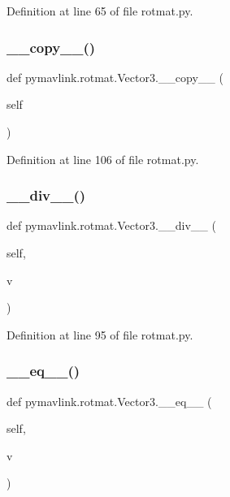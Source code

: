 Definition at line 65 of file rotmat.\+py.

\mbox{\label{classpymavlink_1_1rotmat_1_1Vector3_acf9ffe33395785fa44d643dafeddca03}} 
\subsubsection{\texorpdfstring{\_\_copy\_\_()}{\_\_copy\_\_()}}
{\footnotesize\ttfamily def pymavlink.\+rotmat.\+Vector3.\+\_\+\+\_\+copy\+\_\+\+\_\+ (\begin{DoxyParamCaption}\item[{}]{self }\end{DoxyParamCaption})}



Definition at line 106 of file rotmat.\+py.

\mbox{\label{classpymavlink_1_1rotmat_1_1Vector3_aa2b5ddcbf7fea7dd749f2b8d38df9e25}} 
\subsubsection{\texorpdfstring{\_\_div\_\_()}{\_\_div\_\_()}}
{\footnotesize\ttfamily def pymavlink.\+rotmat.\+Vector3.\+\_\+\+\_\+div\+\_\+\+\_\+ (\begin{DoxyParamCaption}\item[{}]{self,  }\item[{}]{v }\end{DoxyParamCaption})}



Definition at line 95 of file rotmat.\+py.

\mbox{\label{classpymavlink_1_1rotmat_1_1Vector3_a5bf4f176c370a8bb706c5a9c401eec84}} 
\subsubsection{\texorpdfstring{\_\_eq\_\_()}{\_\_eq\_\_()}}
{\footnotesize\ttfamily def pymavlink.\+rotmat.\+Vector3.\+\_\+\+\_\+eq\+\_\+\+\_\+ (\begin{DoxyParamCaption}\item[{}]{self,  }\item[{}]{v }\end{DoxyParamCaption})}



